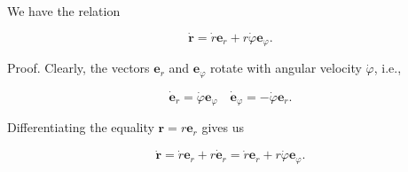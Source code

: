 We have the relation

$$\dot{\mathbf{r}} = \dot{r} \mathbf{e}_r + r \dot{\varphi} \mathbf{e}_\varphi.$$

Proof. Clearly, the vectors $\mathbf{e}_r$ and $\mathbf{e}_\varphi$ rotate with angular velocity $\dot{\varphi}$, i.e.,

$$\dot{\mathbf{e}}_r = \dot{\varphi} \mathbf{e}_\varphi \quad \dot{\mathbf{e}}_\varphi = -\dot{\varphi} \mathbf{e}_r.$$

Differentiating the equality $\mathbf{r} = r \mathbf{e}_r$ gives us

$$\dot{\mathbf{r}} = \dot{r} \mathbf{e}_r + r \dot{\mathbf{e}}_r = \dot{r} \mathbf{e}_r + r \dot{\varphi} \mathbf{e}_\varphi.$$
